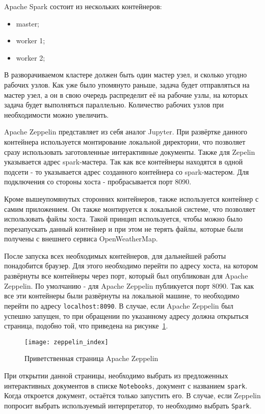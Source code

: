 Apache Spark состоит из нескольких контейнеров:
\begin{itemize}
    \item master;
    \item worker 1;
    \item worker 2;
\end{itemize}

В разворачиваемом кластере должен быть один мастер узел, и сколько угодно рабочих узлов.
Как уже было упомянуто раньше, задача будет отправляться на мастер узел, а он в свою очередь распределит её на рабочие узлы, на которых задача будет выполняться параллельно.
Количество рабочих узлов при необходимости можно увеличить.

Apache Zeppelin представляет из себя аналог Jupyter.
При развёртке данного контейнера используется монтирование локальной директории, что позволяет сразу использовать заготовленные интерактивные документы.
Также для Zepelin указывается адрес spark-мастера.
Так как все контейнеры находятся в одной подсети - то указывается адрес созданного контейнера со spark-мастером.
Для подключения со стороны хоста - пробрасывается порт 8090.

Кроме вышеупомянутых сторонних контейнеров, также используется контейнер с самим приложением.
Он также монтируется к локальной системе, что позволяет использовать файлы хоста.
Такой принцип используется, чтобы можно было перезапускать данный контейнер и при этом не терять файлы, которые были получены с внешнего сервиса OpenWeatherMap.

После запуска всех необходимых контейнеров, для дальнейшей работы понадобится браузер.
Для этого необходимо перейти по адресу хоста, на котором развёрнуты все контейнеры через порт, который был опубликован для Apache Zeppelin.
По умолчанию - для Apache Zeppelin публикуется порт 8090.
Так как все эти контейнеры были развёрнуты на локальной машине, то необходимо перейти по адресу \texttt{localhost:8090}.
В случае, если Apache Zeppelin был успешно запущен, то при обращении по указанному адресу должна открыться страница, подобно той, что приведена на рисунке~\ref{pic:lit_manual:zeppelin_index}.

\begin{figure}
    \centering
    \texttt{[image: zeppelin\_index]}
    \caption{Приветственная страница Apache Zeppelin}
    \label{pic:lit_manual:zeppelin_index}
\end{figure}

При открытии данной страницы, необходимо выбрать из предложенных интерактивных документов в списке \texttt{Notebooks}, документ с названием \texttt{spark}.
Когда откроется документ, остаётся только запустить его.
В случае, если Zeppelin попросит выбрать используемый интерпретатор, то необходимо выбрать \texttt{Spark}.

